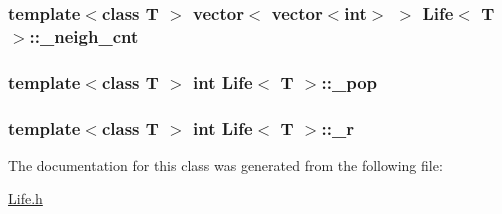 \hypertarget{classLife_add8ba14e19e6a8a607ce21c760f694b0}{
\subsubsection[{\-\_\-neigh\-\_\-cnt}]{\setlength{\rightskip}{0pt plus 5cm}template$<$class T $>$ vector$<$ vector$<$int$>$ $>$ {\bf Life}$<$ T $>$\-::\-\_\-neigh\-\_\-cnt\hspace{0.3cm}{\ttfamily [private]}}}\label{classLife_add8ba14e19e6a8a607ce21c760f694b0}
\hypertarget{classLife_afb729fe0cf5f5cb909b8c36de4ea689f}{
\subsubsection[{\-\_\-pop}]{\setlength{\rightskip}{0pt plus 5cm}template$<$class T $>$ int {\bf Life}$<$ T $>$\-::\-\_\-pop\hspace{0.3cm}{\ttfamily [private]}}}\label{classLife_afb729fe0cf5f5cb909b8c36de4ea689f}
\hypertarget{classLife_a26447fd1550c387c632ae95866e41838}{
\subsubsection[{\-\_\-r}]{\setlength{\rightskip}{0pt plus 5cm}template$<$class T $>$ int {\bf Life}$<$ T $>$\-::\-\_\-r\hspace{0.3cm}{\ttfamily [private]}}}\label{classLife_a26447fd1550c387c632ae95866e41838}


The documentation for this class was generated from the following file\-:\begin{DoxyCompactItemize}
\item 
\hyperlink{Life_8h}{Life.\-h}\end{DoxyCompactItemize}
